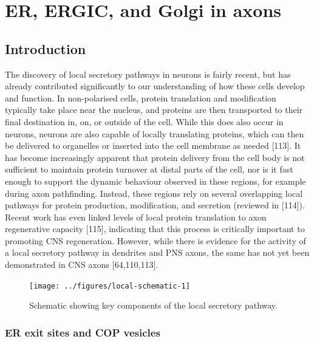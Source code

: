 \documentclass[
  12pt,
  a4paper,
]{book}
\renewcommand{\chaptermark}[1]{\markboth{#1}{}}
\begin{document}
\hypertarget{er-ergic-and-golgi-in-axons}{%
\chapter{ER, ERGIC, and Golgi in axons}\label{er-ergic-and-golgi-in-axons}}

\chaptermark{ER, ERGIC, and Golgi}

\hypertarget{introduction-2}{%
\section{Introduction}\label{introduction-2}}

The discovery of local secretory pathways in neurons is fairly recent, but has already contributed significantly to our understanding of how these cells develop and function. In non-polarised cells, protein translation and modification typically take place near the nucleus, and proteins are then transported to their final destination in, on, or outside of the cell. While this does also occur in neurons, neurons are also capable of locally translating proteins, which can then be delivered to organelles or inserted into the cell membrane as needed {[}113{]}. It has become increasingly apparent that protein delivery from the cell body is not sufficient to maintain protein turnover at distal parts of the cell, nor is it fast enough to support the dynamic behaviour observed in these regions, for example during axon pathfinding. Instead, these regions rely on several overlapping local pathways for protein production, modification, and secretion (reviewed in {[}114{]}). Recent work has even linked levels of local protein translation to axon regenerative capacity {[}115{]}, indicating that this process is critically important to promoting CNS regeneration. However, while there is evidence for the activity of a local secretory pathway in dendrites and PNS axons, the same has not yet been demonstrated in CNS axons {[}64,110,113{]}.

\begin{figure}
\texttt{[image: ../figures/local-schematic-1]} \caption[Schematic of the local secretory pathway]{Schematic showing key components of the local secretory pathway.}\label{fig:local-schematic}
\end{figure}

\hypertarget{er-exit-sites-and-cop-vesicles}{%
\subsection{ER exit sites and COP vesicles}\label{er-exit-sites-and-cop-vesicles}}
\end{document}
